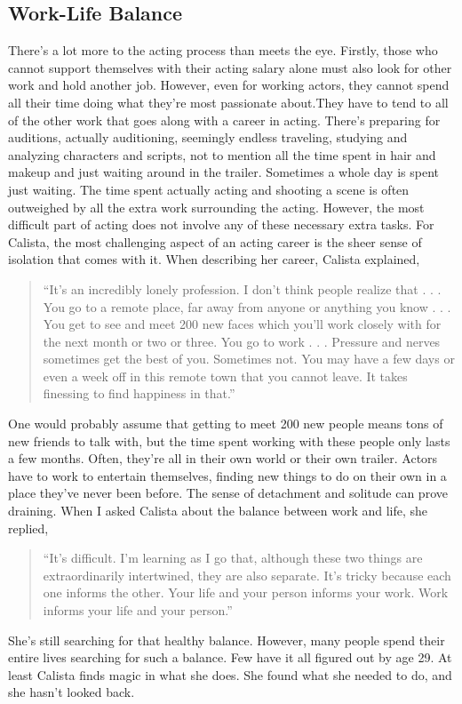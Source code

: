 \begin{multicols}{2}
\section{Work-Life Balance}
		There’s a lot more to the acting process than meets the eye. Firstly, those who cannot support themselves with their acting salary alone must also look for other work and hold another job. However, even for working actors, they cannot spend all their time doing what they’re most passionate about.They have to tend to all of the other work that goes along with a career in acting. There’s preparing for auditions, actually auditioning, seemingly endless traveling, studying and analyzing characters and scripts, not to mention all the time spent in hair and makeup and just waiting around in the trailer. Sometimes a whole day is spent just waiting. The time spent actually acting and shooting a scene is often outweighed by all the extra work surrounding the acting. However, the most difficult part of acting does not involve any of these necessary extra tasks. For Calista, the most challenging aspect of an acting career is the sheer sense of isolation that comes with it. When describing her career, Calista explained,
		\begin{quote}
			“It's an incredibly lonely profession. I don't think people realize that . . . You go to a remote place, far away from anyone or anything you know . . . You get to see and meet 200 new faces which you'll work closely with for the next month or two or three. You go to work . . . Pressure and nerves sometimes get the best of you. Sometimes not. You may have a few days or even a week off in this remote town that you cannot leave. It takes finessing to find happiness in that.”
		\end{quote}
		One would probably assume that getting to meet 200 new people means tons of new friends to talk with, but the time spent working with these people only lasts a few months. Often, they’re all in their own world or their own trailer. Actors have to work to entertain themselves, finding new things to do on their own in a place they’ve never been before. The sense of detachment and solitude can prove draining. When I asked Calista about the balance between work and life, she replied,
		\begin{quote}
			“It's difficult. I'm learning as I go that, although these two things are extraordinarily intertwined, they are also separate. It's tricky because each one informs the other. Your life and your person informs your work. Work informs your life and your person.”
		\end{quote}
		She’s still searching for that healthy balance. However, many people spend their entire lives searching for such a balance. Few have it all figured out by age 29. At least Calista finds magic in what she does. She found what she needed to do, and she hasn’t looked back. 
\end{multicols}